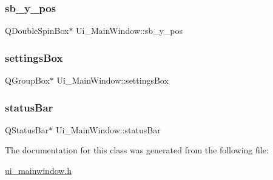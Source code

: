 \subsubsection{\texorpdfstring{sb\+\_\+y\+\_\+pos}{sb\_y\_pos}}
{\footnotesize\ttfamily Q\+Double\+Spin\+Box$\ast$ Ui\+\_\+\+Main\+Window\+::sb\+\_\+y\+\_\+pos}

\mbox{\label{class_ui___main_window_afa8361dafeea9335501efa7f218549a8}} 
\subsubsection{\texorpdfstring{settings\+Box}{settingsBox}}
{\footnotesize\ttfamily Q\+Group\+Box$\ast$ Ui\+\_\+\+Main\+Window\+::settings\+Box}

\mbox{\label{class_ui___main_window_a50fa481337604bcc8bf68de18ab16ecd}} 
\subsubsection{\texorpdfstring{status\+Bar}{statusBar}}
{\footnotesize\ttfamily Q\+Status\+Bar$\ast$ Ui\+\_\+\+Main\+Window\+::status\+Bar}



The documentation for this class was generated from the following file\+:\begin{DoxyCompactItemize}
\item 
\hyperlink{ui__mainwindow_8h}{ui\+\_\+mainwindow.\+h}\end{DoxyCompactItemize}
